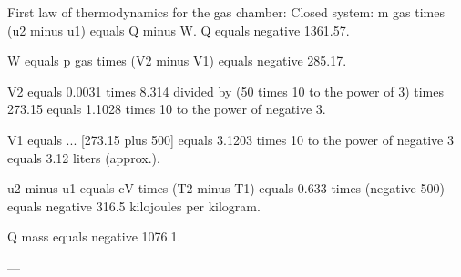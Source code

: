 First law of thermodynamics for the gas chamber:  
Closed system:  
m gas times (u2 minus u1) equals Q minus W.  
Q equals negative 1361.57.  

W equals p gas times (V2 minus V1) equals negative 285.17.  

V2 equals 0.0031 times 8.314 divided by (50 times 10 to the power of 3) times 273.15 equals 1.1028 times 10 to the power of negative 3.  

V1 equals ... [273.15 plus 500] equals 3.1203 times 10 to the power of negative 3 equals 3.12 liters (approx.).  

u2 minus u1 equals cV times (T2 minus T1) equals 0.633 times (negative 500) equals negative 316.5 kilojoules per kilogram.  

Q mass equals negative 1076.1.  

---